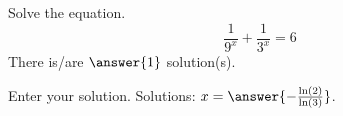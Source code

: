 \documentclass{ximera}
\author{Bobby Ramsey}
\begin{document}
\begin{exercise}
	Solve the equation.
	\[ \frac{1}{9^x} + \frac{1}{3^x} = 6 \]
	There is/are $\answer{1}$ solution(s).
	\begin{exercise}
		Enter your solution.
		Solutions: $x = \answer{ -\frac{\ln(2)}{\ln(3)} }$.
	\end{exercise}
\end{exercise}
\end{document}
